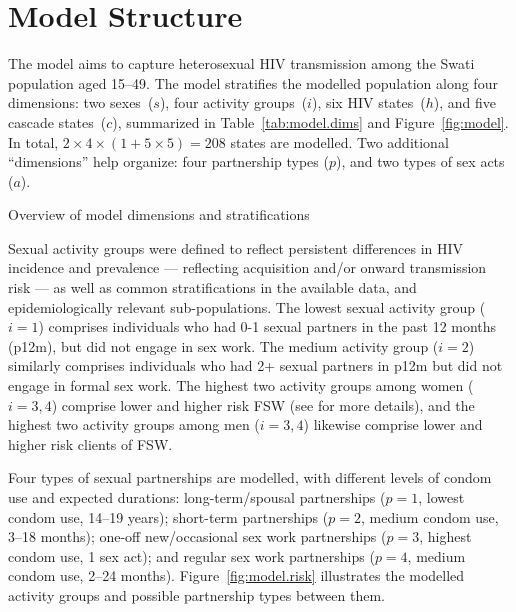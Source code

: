 \section{Model Structure}\label{model.str}
The model aims to capture heterosexual HIV transmission among the Swati population aged 15--49.
The model stratifies the modelled population along four dimensions:
two sexes~($s$), four activity groups~($i$), six HIV states~($h$), and five cascade states~($c$),
summarized in Table~\ref{tab:model.dims} and Figure~\ref{fig:model}.
In total, $2 \times 4 \times (1 + 5 \times 5) = 208$ states are modelled.
Two additional ``dimensions'' help organize:
four partnership types ($p$), and two types of sex acts ($a$).
\begin{table}
  \centering
  \caption{Overview of model dimensions and stratifications}
  \label{tab:model.dims}
  
\end{table}
\par
Sexual activity groups were defined to reflect
persistent differences in HIV incidence and prevalence
\cite{SDHS2006,Bicego2013,Justman2016,SHIMS2}
--- reflecting acquisition and/or onward transmission risk ---
as well as common stratifications in the available data,
and epidemiologically relevant sub-populations.
The lowest sexual activity group ($i=1$) comprises
individuals who had 0-1 sexual partners in the past 12 months (p12m),
but did not engage in sex work.
The medium activity group ($i=2$) similarly comprises
individuals who had 2+ sexual partners in p12m
but did not engage in formal sex work.
The highest two activity groups among women ($i=3,4$) comprise
lower and higher risk FSW (see  for more details), and
the highest two activity groups among men ($i=3,4$) likewise comprise
lower and higher risk clients of FSW.
\par
Four types of sexual partnerships are modelled,
with different levels of condom use and expected durations:
long-term/spousal partnerships ($p=1$, lowest condom use, 14--19 years);
short-term partnerships ($p=2$, medium condom use, 3--18 months);
one-off new/occasional sex work partnerships ($p=3$, highest condom use, 1 sex act);
and regular sex work partnerships ($p=4$, medium condom use, 2--24 months).
Figure~\ref{fig:model.risk} illustrates
the modelled activity groups and possible partnership types between them.
